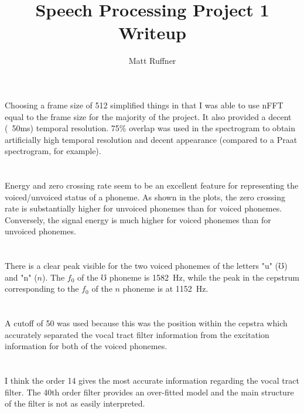 \documentclass[letterpaper]{article}
\title{Speech Processing Project 1 Writeup}
\author{Matt Ruffner}
\begin{document}
\maketitle

\section{}
Choosing a frame size of 512 simplified things in that I was able to use nFFT equal to the frame size for the majority of the project. It also provided a decent (~50ms) temporal resolution. 75\% overlap was used in the spectrogram to obtain artificially high temporal resolution and decent appearance (compared to a Praat spectrogram, for example).

\section{}
Energy and zero crossing rate seem to be an excellent feature for representing the voiced/unvoiced status of a phoneme. As shown in the plots, the zero crossing rate is substantially higher for unvoiced phonemes than for voiced phonemes. Conversely, the signal energy is much higher for voiced phonemes than for unvoiced phonemes.


\section{}
There is a clear peak visible for the two voiced phonemes of the letters "u" ($\mho$) and "n" ($n$). The $f_0$ of the $\mho$ phoneme is 1582~Hz, while the peak in the cepstrum corresponding to the $f_0$ of the $n$ phoneme is at 1152~Hz.


\section{}
A cutoff of 50 was used because this was the position within the cepstra which accurately separated the vocal tract filter information from the excitation information for both of the voiced phonemes.

\section{}
I think the order 14 gives the most accurate information regarding the vocal tract filter. The 40th order filter provides an over-fitted model and the main structure of the filter is not as easily interpreted.
\end{document}
